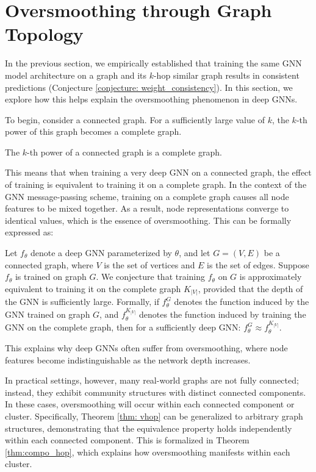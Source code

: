 \section{Oversmoothing through Graph Topology}
In the previous section, we empirically established that training the same GNN model architecture on a graph and its $k$-hop similar graph results in consistent predictions (Conjecture \ref{conjecture: weight_consistency}). In this section, we explore how this helps explain the oversmoothing phenomenon in deep GNNs.

To begin, consider a connected graph. For a sufficiently large value of $k$, the $k$-th power of this graph becomes a complete graph.

\begin{proposition} The $k$-th power of a connected graph is a complete graph. \end{proposition}

This means that when training a very deep GNN on a connected graph, the effect of training is equivalent to training it on a complete graph. In the context of the GNN message-passing scheme, training on a complete graph causes all node features to be mixed together. As a result, node representations converge to identical values, which is the essence of oversmoothing. This can be formally expressed as:
\begin{theorem}
\label{thm: vhop}
Let $f_\theta$ denote a deep GNN parameterized by $\theta$, and let $G = (V, E)$ be a connected graph, where $V$ is the set of vertices and $E$ is the set of edges. Suppose $f_\theta$ is trained on graph $G$. We conjecture that training $f_\theta$ on $G$ is approximately equivalent to training it on the complete graph $K_{|V|}$, provided that the depth of the GNN is sufficiently large. Formally, if $f_\theta^{G}$ denotes the function induced by the GNN trained on graph $G$, and $f_\theta^{K_{|V|}}$ denotes the function induced by training the GNN on the complete graph, then for a sufficiently deep GNN: $f_\theta^{G} \approx f_\theta^{K_{|V|}}.$
\end{theorem}

This explains why deep GNNs often suffer from oversmoothing, where node features become indistinguishable as the network depth increases.

In practical settings, however, many real-world graphs are not fully connected; instead, they exhibit community structures with distinct connected components. In these cases, oversmoothing will occur within each connected component or cluster. Specifically, Theorem \ref{thm: vhop} can be generalized to arbitrary graph structures, demonstrating that the equivalence property holds independently within each connected component. This is formalized in Theorem \ref{thm:compo_hop}, which explains how oversmoothing manifests within each cluster.

